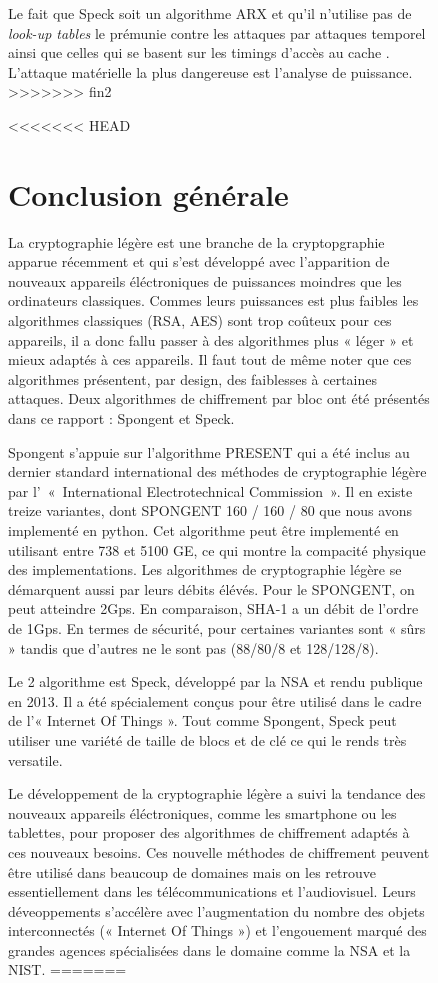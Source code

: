 \begin{figure}[!h]
			Le fait que Speck soit un algorithme ARX
			et qu'il n'utilise pas de \textit{look-up tables} le prémunie contre
			les attaques par attaques temporel ainsi que celles qui se basent sur les
			timings d'accès au cache \cite{speck_design}. L'attaque matérielle
			la plus dangereuse est l'analyse de puissance.
>>>>>>> fin2

	
\newpage
<<<<<<< HEAD
\part*{Conclusion générale}

La cryptographie légère est une branche de la cryptopgraphie apparue récemment et qui s'est développé avec l'apparition de nouveaux appareils éléctroniques de puissances moindres que les ordinateurs classiques.
Commes leurs puissances est plus faibles les algorithmes classiques (RSA, AES) sont trop coûteux pour ces appareils, il a donc fallu passer à des algorithmes plus « léger » et mieux adaptés à ces appareils.
Il faut tout de même noter que ces algorithmes présentent, par design, des faiblesses à certaines attaques.
Deux algorithmes de chiffrement par bloc ont été présentés dans ce rapport : Spongent et Speck.

Spongent s'appuie sur l'algorithme PRESENT qui a été inclus au dernier standard international des méthodes de cryptographie légère par l' « International Electrotechnical Commission ».
Il en existe treize variantes, dont SPONGENT 160 / 160 / 80 que nous avons implementé en python.
Cet algorithme peut être implementé en utilisant entre 738 et 5100 GE, ce qui montre la compacité physique des implementations.
Les algorithmes de cryptographie légère se démarquent aussi par leurs débits élévés. Pour le SPONGENT, on peut atteindre 2Gps.
En comparaison, SHA-1 a un débit de l'ordre de 1Gps.
En termes de sécurité, pour certaines variantes sont « sûrs » tandis que d'autres ne le sont pas (88/80/8 et 128/128/8).

Le 2 algorithme est Speck, développé par la NSA et rendu publique en 2013. Il a été spécialement conçus pour être utilisé dans le cadre de l'« Internet Of Things ».
Tout comme Spongent, Speck peut utiliser une variété de taille de blocs et de clé ce qui le rends très versatile.

Le développement de la cryptographie légère a suivi la tendance des nouveaux appareils éléctroniques, comme les smartphone ou les tablettes, pour proposer des algorithmes de chiffrement adaptés à ces nouveaux besoins.
Ces nouvelle méthodes de chiffrement peuvent être utilisé dans beaucoup de domaines mais on les retrouve essentiellement dans les télécommunications et l'audiovisuel.
Leurs déveoppements s'accélère avec l'augmentation du nombre des objets interconnectés (« Internet Of Things ») et l'engouement marqué des grandes agences spécialisées dans le domaine comme la NSA et la NIST.
=======

\end{figure}
